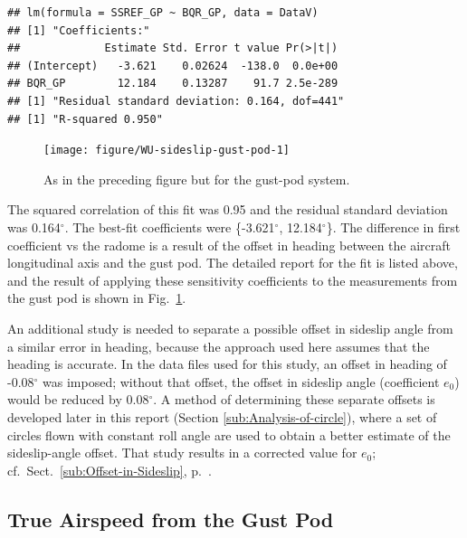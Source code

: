 \documentclass[12pt,twoside,english]{article}\usepackage[]{graphicx}\usepackage[]{color}
\makeatletter
\newenvironment{kframe}{%
 \def\at@end@of@kframe{}%
 \ifinner\ifhmode%
  \def\at@end@of@kframe{\end{minipage}}%
  \begin{minipage}{\columnwidth}%
 \fi\fi%
 \def\FrameCommand##1{\hskip\@totalleftmargin \hskip-\fboxsep
 \colorbox{shadecolor}{##1}\hskip-\fboxsep
     \hskip-\linewidth \hskip-\@totalleftmargin \hskip\columnwidth}%
 \MakeFramed {\advance\hsize-\width
   \@totalleftmargin\z@ \linewidth\hsize
   \@setminipage}}%
 {\par\unskip\endMakeFramed%
 \at@end@of@kframe}
\newenvironment{knitrout}{}{} %
\makeatother
\begin{document}
\begin{knitrout}\footnotesize
{}\color{fgcolor}\begin{kframe}
\begin{verbatim}
## lm(formula = SSREF_GP ~ BQR_GP, data = DataV)
## [1] "Coefficients:"
##             Estimate Std. Error t value Pr(>|t|)
## (Intercept)   -3.621    0.02624  -138.0  0.0e+00
## BQR_GP        12.184    0.13287    91.7 2.5e-289
## [1] "Residual standard deviation: 0.164, dof=441"
## [1] "R-squared 0.950"
\end{verbatim}
\end{kframe}\begin{figure}

{\centering \texttt{[image: figure/WU-sideslip-gust-pod-1]} 

}

\caption[As in the preceding figure but for the gust-pod system]{As in the preceding figure but for the gust-pod system.}\label{fig:sideslip-gust-pod}
\end{figure}


\end{knitrout}

The squared correlation of this fit was 0.95 and the residual standard deviation was 0.164$^{\circ}$. The best-fit coefficients were \{-3.621$^{\circ}$, 
12.184$^{\circ}$\}. The difference in first coefficient vs the radome is a result of the offset in heading between the aircraft longitudinal axis and the gust pod. The detailed report for the fit is listed above, and the result of applying these sensitivity coefficients to the measurements from the gust pod is shown in Fig.~\ref{fig:sideslip-gust-pod}. 

An additional study is needed to separate a possible offset in sideslip angle from a similar error in heading, because the approach used here assumes that the heading is accurate. In the data files used for this study, an offset in heading of -0.08$^{\circ}$ was imposed; without that offset, the offset in sideslip angle (coefficient $e_{0}$) would be reduced by 0.08$^{\circ}$. A method of determining these separate offsets is developed later in this report (Section \ref{sub:Analysis-of-circle}), where a set of circles flown with constant roll angle are used to obtain a better estimate of the sideslip-angle offset. That study results in a corrected value for $e_{0}$; cf.~Sect.~\ref{sub:Offset-in-Sideslip}, p.~\pageref{page:SSoffset}. 


\subsection{True Airspeed from the Gust Pod\label{sub:GP-TAS}}
\end{document}
